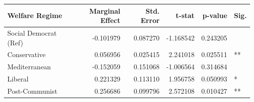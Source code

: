 \begin{tabular}{lrrrrl}
\toprule
Welfare Regime & Marginal Effect & Std. Error & t-stat & p-value & Sig. \\
\midrule
Social Democrat (Ref) & -0.101979 & 0.087270 & -1.168542 & 0.243205 &  \\
Conservative & 0.056956 & 0.025415 & 2.241018 & 0.025511 & ** \\
Mediterranean & -0.152059 & 0.151068 & -1.006564 & 0.314684 &  \\
Liberal & 0.221329 & 0.113110 & 1.956758 & 0.050993 & * \\
Post-Communist & 0.256686 & 0.099796 & 2.572108 & 0.010427 & ** \\
\bottomrule
\end{tabular}
